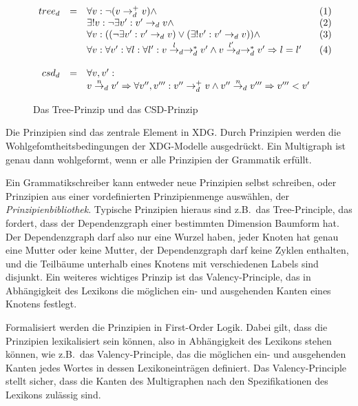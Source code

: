 \begin{figure}
$$
\begin{array}{r c l c}
tree_d & = & \forall v: \neg (v \rightarrow_d^+ v) \wedge & (1)\\
       &   & \exists ! v: \neg \exists v' : v' \rightarrow_d v
       \wedge & (2)\\
       &   & \forall v : (( \neg \exists v' : v' \rightarrow_d
       v) \vee (\exists ! v' : v' \rightarrow_d v)) \wedge & (3)\\
       &   & \forall v: \forall v': \forall l : \forall l' : v
       \overset{l}{\rightarrow}_d \rightarrow_d^* v' \wedge v
       \overset{l'}{\rightarrow}_d \rightarrow_d^* v' 
       \Rightarrow l = l' & (4)\\
      &   &  & \\
csd_d & = & \forall v, v': & \\
      &   & v \overset{n}{\rightarrow}_d v' \Rightarrow \forall
      v'', v''': v'' \rightarrow^+_d v \wedge v''
      \overset{n}{\rightarrow}_d v''' \Rightarrow v''' < v' &  
\end{array}$$

\caption{Das Tree-Prinzip und das CSD-Prinzip}
\label{treeprinciple}
\end{figure}

Die Prinzipien sind das zentrale Element in XDG. Durch Prinzipien
werden die Wohlgefomtheitsbedingungen der XDG-Modelle ausgedr\"uckt.
Ein Multigraph ist genau dann wohlgeformt, wenn er alle Prinzipien der
Grammatik erf\"ullt.

Ein Grammatikschreiber kann entweder neue Prinzipien selbst schreiben,
oder Prinzipien aus einer vordefinierten Prinzipienmenge ausw\"ahlen,
der \emph{Prinzipienbibliothek}.  Typische Prinzipien hieraus sind
z.B.\ das Tree-Principle, das fordert, dass der Dependenzgraph einer
bestimmten Dimension Baumform hat. Der Dependenzgraph darf also nur
eine Wurzel haben, jeder Knoten hat genau eine Mutter oder keine
Mutter, der Dependenzgraph darf keine Zyklen enthalten, und die
Teilb\"aume unterhalb eines Knotens mit verschiedenen Labels sind
disjunkt. Ein weiteres wichtiges Prinzip ist das Valency-Principle,
das in Abh\"angigkeit des Lexikons die m\"oglichen ein- und
ausgehenden Kanten eines Knotens festlegt.

Formalisiert werden die Prinzipien in First-Order Logik. Dabei gilt,
dass die Prinzipien lexikalisiert sein k\"onnen, also in
Abh\"angigkeit des Lexikons stehen k\"onnen, wie z.B.\ das
Valency-Principle, das die m\"oglichen ein- und ausgehenden Kanten
jedes Wortes in dessen Lexikoneintr\"agen definiert. Das
Valency-Principle stellt sicher, dass die Kanten des Multigraphen nach
den Spezifikationen des Lexikons zul\"assig sind.

